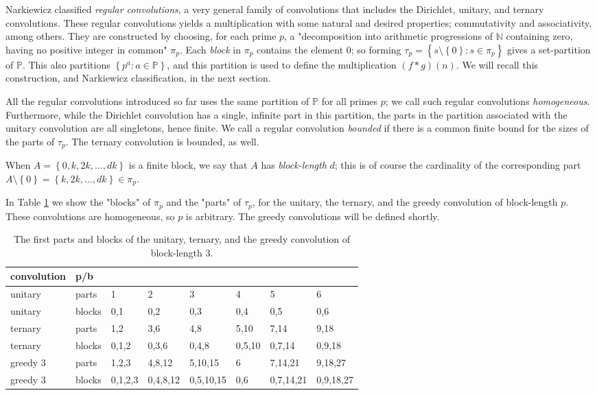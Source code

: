\documentclass[12pt]{article}
\theoremstyle{definition}
\theoremstyle{remark}
\theoremstyle{plain}
\newcommand{\set}[1]{\left\{{#1}\right\}}
\newcommand\setsuchas[2]{\left\{{#1}:{#2}\right\}}
\newcommand{\NN}{{\mathbb{N}}}
\newcommand{\NNp}{{\mathbb{P}}}
\begin{document}
Narkiewicz \cite{Nark:conv} classified \emph{regular convolutions},
a very general family of convolutions that includes the Dirichlet, unitary, and ternary convolutions.
These regular convolutions yields a multiplication with some natural and desired properties;
commutativity and associativity, among others.
They are constructed by choosing, for each prime \(p\), a
"decomposition into arithmetic progressions of \(\NN\) containing zero, having
no positive integer in common"  \(\pi_{p}\).
Each \emph{block} in \(\pi_{p}\) contains the element 0;
so forming \(\tau_{p} = \setsuchas{s \setminus \set{0}}{s \in \pi_p}\) gives a set-partition of \(\NNp\).
This also partitions
\(\setsuchas{p^{a}}{a \in \NNp}\), and this partition is used to define the multiplication \((f*g)(n)\).
We will recall this construction, and Narkiewicz classification, in the next section.

All the regular convolutions introduced so far uses the same partition of \(\NNp\) for
all primes \(p\); we call such regular convolutions \emph{homogeneous}.
Furthermore, while the Dirichlet convolution has a single, infinite part in this partition, the
parts in the partition associated with the unitary convolution are all singletons, hence finite. We
call a regular convolution \emph{bounded}  if there is a common finite bound for the sizes of the parts of \(\tau_{p}\).
The ternary convolution is bounded, as well.

When \(A = \set{0, k, 2k, \dots, dk}\) is a finite block, we say that \(A\) has \emph{block-length} \(d\);
this is of course the cardinality of the  corresponding part
\(A \setminus \set{0} = \set{k, 2k, \dots, dk} \in \pi_p\). 

In Table \ref{tab:orge53dce4} we show the "blocks" of \(\pi_{p}\) and the "parts" of \(\tau_{p}\),
for the unitary, the ternary, and the greedy convolution of block-length \(p\).
These convolutions are homogeneous, so  \(p\) is arbitrary.
The greedy convolutions will be defined shortly.

\begin{table}[htbp]
\caption{\label{tab:orge53dce4}The first parts and blocks of the unitary, ternary, and the greedy convolution of block-length 3.}
\centering
\begin{tabular}{llllllll}
convolution & p/b &  &  &  &  &  & \\
\hline
unitary & parts & 1 & 2 & 3 & 4 & 5 & 6\\
unitary & blocks & 0,1 & 0,2 & 0,3 & 0,4 & 0,5 & 0,6\\
ternary & parts & 1,2 & 3,6 & 4,8 & 5,10 & 7,14 & 9,18\\
ternary & blocks & 0,1,2 & 0,3,6 & 0,4,8 & 0,5,10 & 0,7,14 & 0,9,18\\
greedy 3 & parts & 1,2,3 & 4,8,12 & 5,10,15 & 6 & 7,14,21 & 9,18,27\\
greedy 3 & blocks & 0,1,2,3 & 0,4,8,12 & 0,5,10,15 & 0,6 & 0,7,14,21 & 0,9,18,27\\
\end{tabular}
\end{table}
\end{document}
